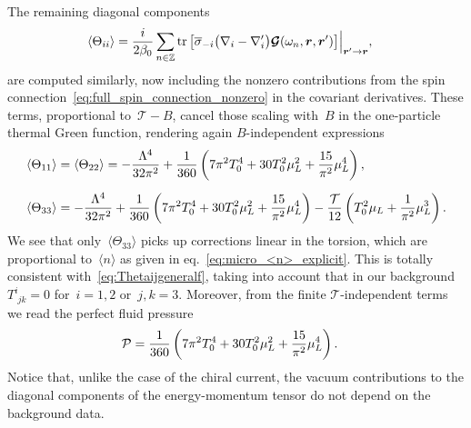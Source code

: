 \documentclass[11pt,a4paper]{article}
\begin{document}
The remaining diagonal components
\begin{align}
\langle\Theta_{ii}\rangle&={i\over 2\beta_{0}}\sum_{n\in \mathbb{Z}}{\rm tr\,}\big[
\overline{\sigma}_{-i}\big(\nabla_{i}-\nabla'_{i}\big)\boldsymbol{\mathcal{G}}(\omega_{n},\boldsymbol{r},\boldsymbol{r}')
\big]\Big|_{\boldsymbol{r}'\rightarrow\boldsymbol{r}},
\end{align}
are computed similarly, now including
the nonzero contributions from the spin connection~\eqref{eq:full_spin_connection_nonzero} 
in the covariant derivatives. These
terms, proportional to~$\mathcal{T}-B$, cancel those
scaling with~$B$ in the one-particle thermal Green function, rendering 
again $B$-independent expressions
\begin{align}
\langle \Theta_{11}\rangle&=\langle \Theta_{22}\rangle
=-{\Lambda^{4}\over 32\pi^{2}}+{1\over 360}\left(7\pi^{2}T_{0}^{4}
+30 T_{0}^{2}\mu_{L}^{2}+{15\over \pi^{2}}\mu_{L}^{4}\right), \nonumber \\[0.2cm]
\langle \Theta_{33}\rangle
&=-{\Lambda^{4}\over 32\pi^{2}}+{1\over 360}\left(7\pi^{2}T_{0}^{4}
+30 T_{0}^{2}\mu_{L}^{2}+{15\over \pi^{2}}\mu_{L}^{4}\right)
-{\mathcal{T}\over 12}\left(T_{0}^{2}\mu_{L}+{1\over \pi^{2}}\mu_{L}^{3}\right).
\label{eq:Theta_22_33_stone}
\end{align}
We see that only~$\langle\Theta_{33}\rangle$ picks up corrections linear in the torsion, which 
are proportional
to~$\langle n\rangle$ as given in eq.~\eqref{eq:micro_<n>_explicit}. This 
is totally consistent with~\eqref{eq:Thetaijgeneralf},
taking into account that in our background~$T^{i}_{\,\,jk}=0$ for~$i=1,2$ or~$j,k=3$.
Moreover, from the finite $\mathcal{T}$-independent terms we read the perfect fluid 
pressure~\cite{Jaiswal:2015mxa}
\begin{align}
\mathcal{P}&={1\over 360}\left(7\pi^{2}T_{0}^{4}
+30 T_{0}^{2}\mu_{L}^{2}+{15\over \pi^{2}}\mu_{L}^{4}\right).
\label{eq:Theta11_stone}
\end{align}
Notice that, unlike the case of the chiral current, the vacuum contributions to the 
diagonal components of the energy-momentum tensor do
not depend on the background data.
\end{document}
